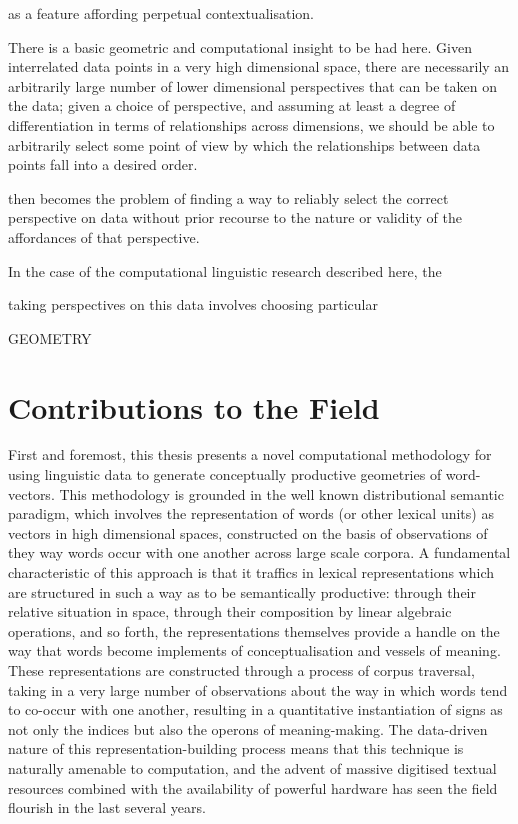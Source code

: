 as a feature affording perpetual contextualisation.

There is a basic geometric and computational insight to be had here.  Given interrelated data points in a very high dimensional space, there are necessarily an arbitrarily large number of lower dimensional perspectives that can be taken on the data; given a choice of perspective, and assuming at least a degree of differentiation in terms of relationships across dimensions, we should be able to arbitrarily select some point of view by which the relationships between data points fall into a desired order.

then becomes the problem of finding a way to reliably select the correct perspective on data without prior recourse to the nature or validity of the affordances of that perspective.

In the case of the computational linguistic research described here, the 

taking perspectives on this data involves choosing particular 

GEOMETRY

\section{Contributions to the Field}
First and foremost, this thesis presents a novel computational methodology for using linguistic data to generate conceptually productive geometries of word-vectors.  This methodology is grounded in the well known distributional semantic paradigm, which involves the representation of words (or other lexical units) as vectors in high dimensional spaces, constructed on the basis of observations of they way words occur with one another across large scale corpora.  A fundamental characteristic of this approach is that it traffics in lexical representations which are structured in such a way as to be semantically productive: through their relative situation in space, through their composition by linear algebraic operations, and so forth, the representations themselves provide a handle on the way that words become implements of conceptualisation and vessels of meaning.  These representations are constructed through a process of corpus traversal, taking in a very large number of observations about the way in which words tend to co-occur with one another, resulting in a quantitative instantiation of signs as not only the indices but also the operons of meaning-making.  The data-driven nature of this representation-building process means that this technique is naturally amenable to computation, and the advent of massive digitised textual resources combined with the availability of powerful hardware has seen the field flourish in the last several years.


